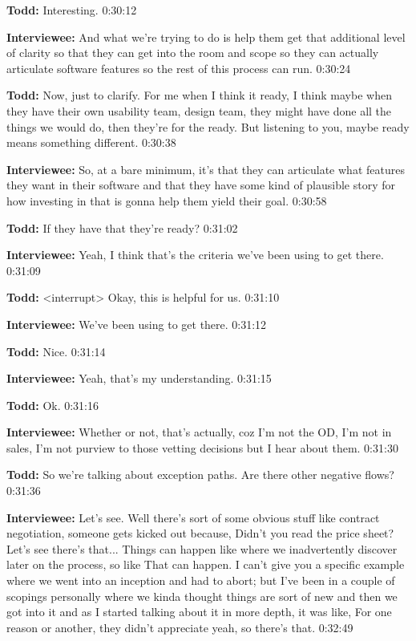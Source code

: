 \textbf{Todd:}  	Interesting.  0:30:12

\textbf{Interviewee:} 	And what we're trying to do is help them get that additional level of clarity so that they can get into the room and scope so they can actually articulate software features so the rest of this process can run.  0:30:24

\textbf{Todd:} 	Now, just to clarify. For me when I think it ready, I think maybe when they have their own usability team, design team, they might have done all the things we would do, then they're for the ready. But listening to you, maybe ready means something different.  0:30:38

\textbf{Interviewee:}	So, at a bare minimum,  it's that they can articulate what features they want in their software and that they have some kind of plausible story for how investing in that is gonna help them yield their goal.  0:30:58

\textbf{Todd:}	If they have that they're ready?  0:31:02

\textbf{Interviewee:}	Yeah, I think that's the criteria we've been using to get there.  0:31:09

\textbf{Todd:} 	<interrupt> Okay, this is helpful for us.  0:31:10

\textbf{Interviewee:} 	We've been using to get there.  0:31:12

\textbf{Todd:}	Nice.  0:31:14

\textbf{Interviewee:}	Yeah, that's my understanding.  0:31:15

\textbf{Todd:}	Ok.  0:31:16

\textbf{Interviewee:}	Whether or not, that's actually, coz I'm not the OD, I'm not in sales, I'm not purview to those vetting decisions but I hear about them.  0:31:30

\textbf{Todd:}	So we're talking about exception paths. Are there other negative flows?  0:31:36

\textbf{Interviewee:}  	Let's see.  Well there's sort of some obvious stuff like contract negotiation, someone gets kicked out because,   Didn't you read the price sheet? Let's see there's that... Things can happen like where we inadvertently discover later on the process, so like   That can happen.  I can't give you a specific example where we went into an inception and had to abort; but I've been in a couple of scopings personally where we kinda thought things are sort of new and then we got into it and as I started talking about it in more depth, it was like,   For one reason or another, they didn't appreciate yeah, so there's that.  0:32:49

